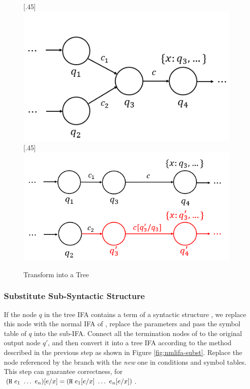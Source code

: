 \begin{figure}[t]
\centering
{}[.45\linewidth]{
    \includegraphics[scale=0.25]{images/nmlifa/nmlifa-tree-1.png}
}
[.45\linewidth]{
    \includegraphics[scale=0.25]{images/nmlifa/nmlifa-tree-2.png}
}
\caption{Transform into a Tree}
\label{fig:nmlifa-tree}
\end{figure}

\subsubsection{Substitute Sub-Syntactic Structure}

If the node $q$ in the tree IFA contains a term of a syntactic structure , we replace this node with the normal IFA of , replace the parameters and pass the symbol table of $q$ into the sub-IFA. Connect all the termination nodes of  to the original output node $q'$, and then convert it into a tree IFA according to the method described in the previous step as shown in Figure \ref{fig:nmlifa-subst}. Replace the node referenced by the branch with the \textit{new} one in conditions and symbol tables. This step can guarantee correctness, for $(\mbox{\tt H}~e_1~\ldots~e_n)[e/x] = (\mbox{\tt H}~e_1[e/x]~\ldots~e_n[e/x])$.

